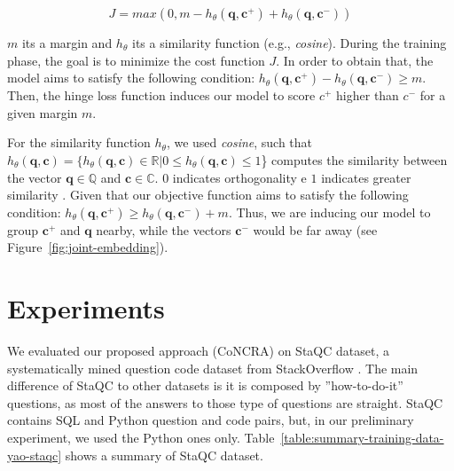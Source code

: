 \documentclass[sigconf]{acmart}
\begin{document}
\begin{equation}
J = max(0, m - h_{\theta}(\bm{q}, \bm{c^{+}}) + h_{\theta}(\bm{q}, \bm{c^{-}}))
\end{equation}

$m$ its a margin and $h_{\theta}$ its a similarity function (e.g., \textit{cosine}). During the training phase, the goal is to minimize the cost function $J$. In order to obtain that, the model aims to satisfy the following condition: $h_{\theta}(\bm{q}, \bm{c^{+}}) - h_{\theta}(\bm{q}, \bm{c^{-}}) \geq m$. Then, the hinge loss function induces our model to score $c^{+}$ higher than $c^{-}$ for a given margin $m$. 

For the similarity function $h_{\theta}$, we used \emph{cosine}, such that $h_{\theta}(\bm{q}, \bm{c}) = \{h_{\theta}(\bm{q}, \bm{c}) \in \mathbb{R} | 0 \leq h_{\theta}(\bm{q}, \bm{c}) \leq 1$\} computes the similarity between the vector $\bm{q} \in \mathbb{Q}$ and $\bm{c} \in \mathbb{C}$. $0$ indicates orthogonality e $1$ indicates greater similarity \cite{keras-cosine-similarity-2019}.  Given that our objective function aims to satisfy the following condition: $h_{\theta}(\bm{q}, \bm{c^{+}}) \geq h_{\theta}(\bm{q}, \bm{c^{-}}) + m$. Thus, we are inducing our model to group $\bm{c^{+}}$ and $\bm{q}$ nearby, while the vectors $\bm{c^{-}}$ would be far away (see Figure~\ref{fig:joint-embedding}). 

\section{Experiments}

We evaluated our proposed approach (CoNCRA) on StaQC dataset, a systematically mined question code dataset from StackOverflow \cite{yao-2018}. The main difference of StaQC to other datasets is it is composed by ''how-to-do-it'' questions, as most of the answers to those type of questions are straight. StaQC contains SQL and Python question and code pairs, but, in our preliminary experiment, we used the Python ones only. Table~\ref{table:summary-training-data-yao-staqc} shows a summary of StaQC dataset.
\end{document}
